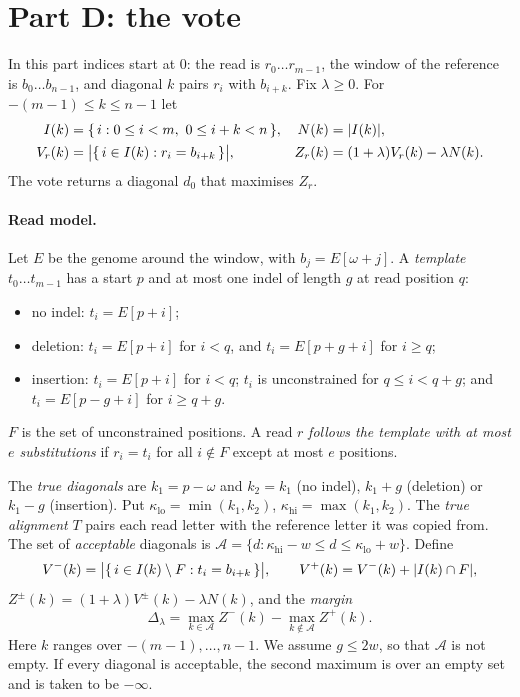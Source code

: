 \documentclass[11pt]{article}
\DeclarePairedDelimiter{\abs}{\lvert}{\rvert}
\newcommand{\A}{\mathcal{A}}
\newcommand{\kaplo}{\kappa_{\mathrm{lo}}}
\newcommand{\kaphi}{\kappa_{\mathrm{hi}}}
\begin{document}
\section{Part D: the vote}

In this part indices start at $0$: the read is $r_0\dots r_{m-1}$, the window
of the reference is $b_0\dots b_{n-1}$, and diagonal $k$ pairs $r_i$ with
$b_{i+k}$. Fix $\lambda \ge 0$. For $-(m-1)\le k\le n-1$ let
\begin{align*}
I(k) &= \{\,i : 0\le i<m,\ 0\le i+k<n\,\}, & N(k) &= \abs{I(k)},\\
V_r(k) &= \abs[\big]{\{\,i\in I(k) : r_i = b_{i+k}\,\}}, &
Z_r(k) &= (1+\lambda)V_r(k) - \lambda N(k).
\end{align*}
The vote returns a diagonal $d_0$ that maximises $Z_r$.

\paragraph{Read model.} Let $E$ be the genome around the window, with
$b_j = E[\omega+j]$. A \emph{template} $t_0\dots t_{m-1}$ has a start $p$ and
at most one indel of length $g$ at read position $q$:
\begin{itemize}[nosep]
\item no indel: $t_i = E[p+i]$;
\item deletion: $t_i = E[p+i]$ for $i<q$, and $t_i = E[p+g+i]$ for $i\ge q$;
\item insertion: $t_i = E[p+i]$ for $i<q$; $t_i$ is unconstrained for
      $q\le i<q+g$; and $t_i = E[p-g+i]$ for $i\ge q+g$.
\end{itemize}
$F$ is the set of unconstrained positions. A read $r$ \emph{follows the
template with at most $e$ substitutions} if $r_i = t_i$ for all $i\notin F$
except at most $e$ positions.

The \emph{true diagonals} are $k_1 = p-\omega$ and $k_2 = k_1$ (no indel),
$k_1+g$ (deletion) or $k_1-g$ (insertion). Put $\kaplo = \min(k_1,k_2)$,
$\kaphi = \max(k_1,k_2)$. The \emph{true alignment} $T$ pairs each read letter
with the reference letter it was copied from. The set of \emph{acceptable}
diagonals is $\A = \{d : \kaphi - w \le d \le \kaplo + w\}$. Define
\[
V^{-}(k) = \abs[\big]{\{\,i\in I(k)\setminus F : t_i = b_{i+k}\,\}},\qquad
V^{+}(k) = V^{-}(k) + \abs{I(k)\cap F},
\]
$Z^{\pm}(k) = (1+\lambda)V^{\pm}(k) - \lambda N(k)$, and the \emph{margin}
\[
\Delta_\lambda = \max_{k\in\A} Z^{-}(k) - \max_{k\notin\A} Z^{+}(k).
\]
Here $k$ ranges over $-(m-1),\dots,n-1$. We assume $g \le 2w$, so that $\A$ is
not empty. If every diagonal is acceptable, the second maximum is over an empty
set and is taken to be $-\infty$.
\end{document}
